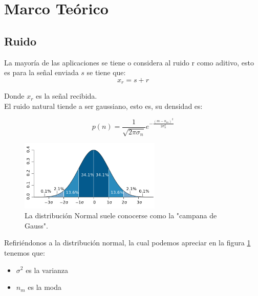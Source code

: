 \documentclass{article}
\author{Pablo Vivar Colina}
\begin{document}
\tableofcontents  %

\listoffigures  %


\section{Marco Teórico}

\subsection{Ruido}

La mayoría de las aplicaciones se tiene o considera al ruido r como aditivo, esto es para la señal enviada $s$ se tiene que:\citep{Capitulo1SC}\\

\begin{equation}
    x_r=s+r
\end{equation}

Donde $x_r$ es la señal recibida.\citep{Capitulo1SC}\\

El ruido natural tiende a ser gaussiano, esto es, su densidad es:\citep{Capitulo1SC}

\begin{equation}
    p(n)=\frac{1}{\sqrt{2 \pi \sigma_n}} e^{-\frac{(m-n_m)^2}{2 \sigma_n^2}}
\end{equation}

\begin{figure}[h!]
    \centering
    
   
\includegraphics[width=0.6\textwidth]{Imagenes/Standard_deviation_diagram.png}
\caption{ La distribución Normal suele conocerse como la "campana de Gauss".}
    \label{fig:distNorm}
 
\end{figure}


Refiriéndonos a la distribución normal, la cual podemos apreciar en la figura \ref{fig:distNorm} tenemos que:\citep{DistribucionNormal}\\

\begin{itemize}
    \item $\sigma^2$ es la varianza
    \item $n_m$ es la moda
\end{itemize}
\end{document}
